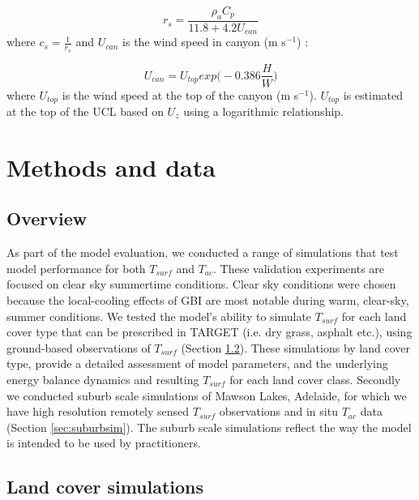 \documentclass[journal abbreviation, manuscript]{copernicus}
\begin{document}
\begin{equation} 
\ensuremath{r_{s}} = 
\frac{\ensuremath{\rho_{a}}\ensuremath{C_{p}}}{11.8+4.2U_{can}}
\label{eq:rs} 
\end{equation} 
where $\ensuremath{c_{s}} = \frac{1}{\ensuremath{r_{s}}}$ and $U_{can}$ is the wind speed in canyon (m s$^{-1}$) \citep{Kusaka2001}: 

\begin{equation} 
U_{can} = \ensuremath{U_{top}} exp{ \Bigg( -0.386 \frac{H}{W} \Bigg)}
\label{eq:ucan} \end{equation} where \ensuremath{U_{top}} is the wind speed at the top of the canyon (m s$^{-1}$). \ensuremath{U_{top}} is estimated at the top of the UCL based on \ensuremath{U_{z}} using a logarithmic relationship.



\section{Methods and data}\label{sec:validation}
\subsection{Overview}\label{sec:validationover}


As part of the model evaluation, we conducted a range of simulations that test model performance for both $T_{surf}$ and $T_{ac}$. These validation experiments are focused on clear sky summertime conditions. Clear sky conditions were chosen because the local-cooling effects of GBI are most notable during warm, clear-sky, summer conditions. We tested the model's ability to simulate $T_{surf}$ for each land cover type that can be prescribed in TARGET (i.e. dry grass, asphalt etc.), using ground-based observations of $T_{surf}$ (Section \ref{sec:landcoversim}). These simulations by land cover type, provide a detailed assessment of model parameters, and the underlying energy balance dynamics and resulting $T_{surf}$ for each land cover class. Secondly we conducted suburb scale simulations of Mawson Lakes, Adelaide, for which we have high resolution remotely sensed $T_{surf}$ observations and in situ $T_{ac}$ data (Section \ref{sec:suburbsim}).  The suburb scale simulations reflect the way the model is intended to be used by practitioners.



\subsection{Land cover simulations}\label{sec:landcoversim} 
\end{document}
